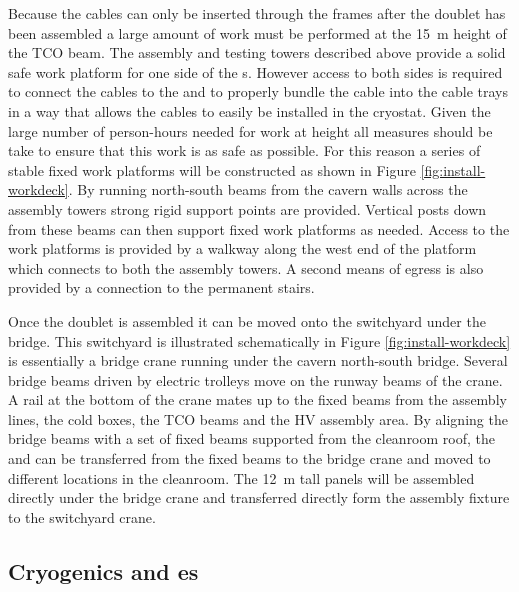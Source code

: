 Because the cables can only be inserted through the  frames after the  doublet has been assembled a large amount of work must be performed at the \SI{15}{m} height of the TCO beam. 
The  assembly and testing towers described above provide a solid safe work platform for one side of the s.
However access to both sides is required to connect the cables to the  and to properly bundle the cable into the cable trays in a way that allows the cables to easily be installed in the cryostat. 
Given the large number of person-hours needed for work at height all measures should be take to ensure that this work is as safe as possible. For this reason a series of stable fixed work platforms will be constructed as shown in Figure \ref{fig:install-workdeck}.
By running north-south beams from the cavern walls across the assembly towers strong rigid support points are provided. 
Vertical posts down from these beams can then support fixed work platforms as needed. Access to the work platforms is provided by a walkway along the west end of the platform which connects to both the assembly towers. A second means of egress is also provided by a connection to the permanent stairs. 




Once the  doublet is assembled it can be moved onto the switchyard under the bridge. 
This switchyard is illustrated schematically in Figure \ref{fig:install-workdeck} is essentially a bridge crane running under the cavern north-south bridge. 
Several bridge beams driven by electric trolleys  move on the runway beams of the crane.  
A rail at the bottom of the crane mates up to the fixed beams  from the assembly lines, the cold boxes, the TCO beams and the HV assembly area.
By aligning the bridge beams with a set of fixed beams supported from the cleanroom roof, the  and  can be transferred from the fixed beams to the bridge crane and moved to different locations in the cleanroom. 
The \SI{12}{m} tall  panels will be assembled directly under the bridge crane and transferred directly form the assembly fixture to the switchyard crane.

\subsection{Cryogenics and \coldbox{}es}
\label{sec:fdsp-tc-infr-cryo}



